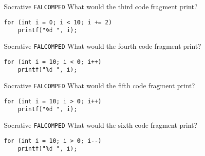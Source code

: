 \begin{frame}[fragile]{Socrative \texttt{FALCOMPED}}
    What would the third code fragment print?
	\begin{lstlisting}
for (int i = 0; i < 10; i += 2)
    printf("%d ", i);
	\end{lstlisting}
\end{frame}

\begin{frame}[fragile]{Socrative \texttt{FALCOMPED}}
    What would the fourth code fragment print?
	\begin{lstlisting}
for (int i = 10; i < 0; i++)
    printf("%d ", i);
	\end{lstlisting}
\end{frame}

\begin{frame}[fragile]{Socrative \texttt{FALCOMPED}}
    What would the fifth code fragment print?
	\begin{lstlisting}
for (int i = 10; i > 0; i++)
    printf("%d ", i);
	\end{lstlisting}
\end{frame}

\begin{frame}[fragile]{Socrative \texttt{FALCOMPED}}
    What would the sixth code fragment print?
	\begin{lstlisting}
for (int i = 10; i > 0; i--)
    printf("%d ", i);
	\end{lstlisting}
\end{frame}
